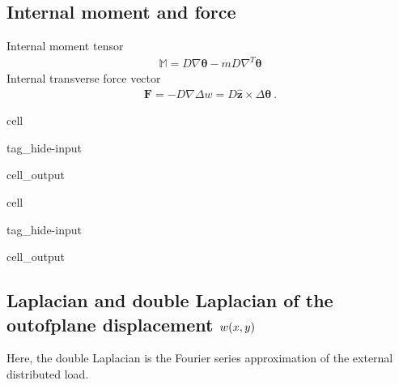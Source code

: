 \documentclass[letterpaper,10pt,english]{jupyterBook}
\begin{document}
\subsection{Internal moment and force}
\label{\detokenize{ch/solids/plates-shells/kirchhoff-analytic-sln:internal-moment-and-force}}
\sphinxAtStartPar
Internal moment tensor
\begin{equation*}
\begin{split}\mathbb{M} = D \nabla \boldsymbol\theta - m D \nabla^T \boldsymbol\theta\end{split}
\end{equation*}
\sphinxAtStartPar
Internal transverse force vector
\begin{equation*}
\begin{split}\mathbf{F} =  - D \nabla \Delta w = D \hat{\mathbf{z}} \times \Delta \boldsymbol\theta \ .\end{split}
\end{equation*}
\begin{sphinxuseclass}{cell}
\begin{sphinxuseclass}{tag_hide-input}\begin{sphinxVerbatimOutput}

\begin{sphinxuseclass}{cell_output}
\noindent{}

\end{sphinxuseclass}\end{sphinxVerbatimOutput}

\end{sphinxuseclass}
\end{sphinxuseclass}
\begin{sphinxuseclass}{cell}
\begin{sphinxuseclass}{tag_hide-input}\begin{sphinxVerbatimOutput}

\begin{sphinxuseclass}{cell_output}
\noindent{}

\end{sphinxuseclass}\end{sphinxVerbatimOutput}

\end{sphinxuseclass}
\end{sphinxuseclass}

\subsection{Laplacian and double Laplacian of the out\sphinxhyphen{}of\sphinxhyphen{}plane displacement \protect\(w(x,y)\protect\)}
\label{\detokenize{ch/solids/plates-shells/kirchhoff-analytic-sln:laplacian-and-double-laplacian-of-the-out-of-plane-displacement-w-x-y}}
\sphinxAtStartPar
Here, the double Laplacian is the Fourier series approximation of the external distributed load.
\end{document}
